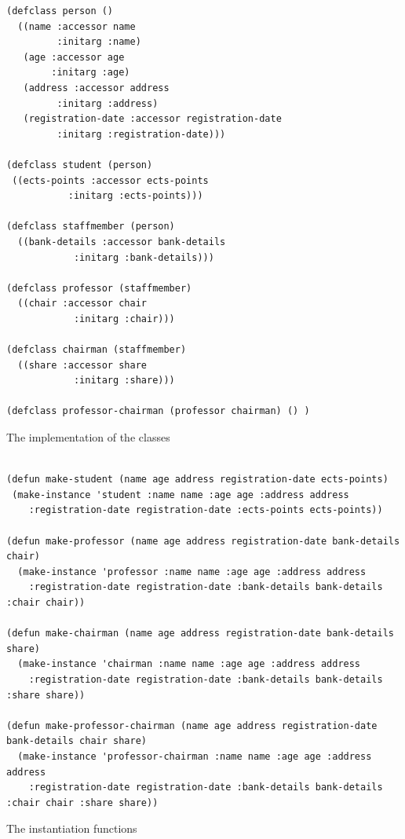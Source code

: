 \documentclass[oribibl]{llncs}
\begin{document}
\begin{listing}[]%
\begin{verbatim}
(defclass person ()
  ((name :accessor name
         :initarg :name)
   (age :accessor age
        :initarg :age)
   (address :accessor address
         :initarg :address)
   (registration-date :accessor registration-date
         :initarg :registration-date)))

(defclass student (person)
 ((ects-points :accessor ects-points
           :initarg :ects-points)))

(defclass staffmember (person)
  ((bank-details :accessor bank-details
            :initarg :bank-details)))

(defclass professor (staffmember)
  ((chair :accessor chair
            :initarg :chair)))

(defclass chairman (staffmember)
  ((share :accessor share
            :initarg :share)))

(defclass professor-chairman (professor chairman) () )
\end{verbatim}
\caption{The implementation of the classes}
\label{lst:entire-implementation}
\end{listing}

\begin{listing}[]%
\begin{verbatim}

(defun make-student (name age address registration-date ects-points)
 (make-instance 'student :name name :age age :address address
    :registration-date registration-date :ects-points ects-points))

(defun make-professor (name age address registration-date bank-details chair)
  (make-instance 'professor :name name :age age :address address
    :registration-date registration-date :bank-details bank-details :chair chair))

(defun make-chairman (name age address registration-date bank-details share)
  (make-instance 'chairman :name name :age age :address address
    :registration-date registration-date :bank-details bank-details :share share))

(defun make-professor-chairman (name age address registration-date bank-details chair share)
  (make-instance 'professor-chairman :name name :age age :address address
    :registration-date registration-date :bank-details bank-details :chair chair :share share))
\end{verbatim}
\caption{The instantiation functions}
\label{lst:insts}
\end{listing}
\end{document}
